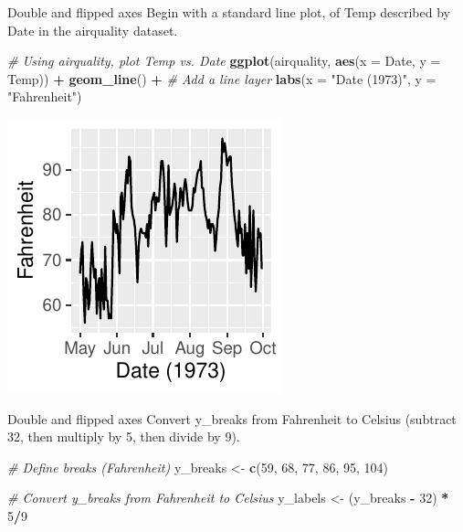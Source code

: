 \documentclass[
  ignorenonframetext,
]{beamer}
\newenvironment{Shaded}{\begin{snugshade}}{\end{snugshade}}
\newcommand{\AttributeTok}[1]{\textcolor[rgb]{0.13,0.29,0.53}{#1}}
\newcommand{\CommentTok}[1]{\textcolor[rgb]{0.56,0.35,0.01}{\textit{#1}}}
\newcommand{\DecValTok}[1]{\textcolor[rgb]{0.00,0.00,0.81}{#1}}
\newcommand{\FunctionTok}[1]{\textcolor[rgb]{0.13,0.29,0.53}{\textbf{#1}}}
\newcommand{\NormalTok}[1]{#1}
\newcommand{\OtherTok}[1]{\textcolor[rgb]{0.56,0.35,0.01}{#1}}
\newcommand{\SpecialCharTok}[1]{\textcolor[rgb]{0.81,0.36,0.00}{\textbf{#1}}}
\newcommand{\StringTok}[1]{\textcolor[rgb]{0.31,0.60,0.02}{#1}}
\begin{document}
\begin{frame}[fragile]{Double and flipped axes}
\label{double-and-flipped-axes-4}
Begin with a standard line plot, of Temp described by Date in the
airquality dataset.


\begin{Shaded}
\begin{Highlighting}[]
\CommentTok{\# Using airquality, plot Temp vs. Date}
\FunctionTok{ggplot}\NormalTok{(airquality, }\FunctionTok{aes}\NormalTok{(}\AttributeTok{x =}\NormalTok{ Date, }\AttributeTok{y =}\NormalTok{ Temp)) }\SpecialCharTok{+}
  \FunctionTok{geom\_line}\NormalTok{() }\SpecialCharTok{+} \CommentTok{\# Add a line layer}
  \FunctionTok{labs}\NormalTok{(}\AttributeTok{x =} \StringTok{"Date (1973)"}\NormalTok{, }\AttributeTok{y =} \StringTok{"Fahrenheit"}\NormalTok{)}
\end{Highlighting}
\end{Shaded}

\begin{center}\includegraphics[width=0.5\linewidth]{Figs/unnamed-chunk-54-1} \end{center}
\end{frame}

\begin{frame}[fragile]{Double and flipped axes}
\label{double-and-flipped-axes-5}
Convert y\_breaks from Fahrenheit to Celsius (subtract 32, then multiply
by 5, then divide by 9).


\begin{Shaded}
\begin{Highlighting}[]
\CommentTok{\# Define breaks (Fahrenheit)}
\NormalTok{y\_breaks }\OtherTok{\textless{}{-}} \FunctionTok{c}\NormalTok{(}\DecValTok{59}\NormalTok{, }\DecValTok{68}\NormalTok{, }\DecValTok{77}\NormalTok{, }\DecValTok{86}\NormalTok{, }\DecValTok{95}\NormalTok{, }\DecValTok{104}\NormalTok{)}

\CommentTok{\# Convert y\_breaks from Fahrenheit to Celsius}
\NormalTok{y\_labels }\OtherTok{\textless{}{-}}\NormalTok{ (y\_breaks }\SpecialCharTok{{-}} \DecValTok{32}\NormalTok{) }\SpecialCharTok{*} \DecValTok{5}\SpecialCharTok{/}\DecValTok{9}
\end{Highlighting}
\end{Shaded}
\end{frame}
\end{document}
